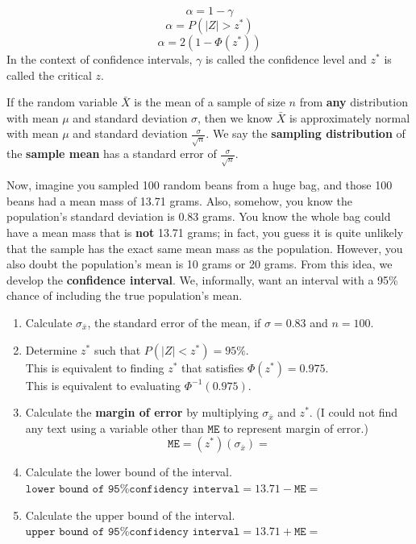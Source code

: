 \documentclass[12pt,letterpaper]{article}
\begin{document}
$$\alpha = 1-\gamma $$
$$\alpha = P(|Z| > z^*) $$
$$\alpha = 2(1-\Phi(z^*)) $$
In the context of confidence intervals, $\gamma$ is called the confidence level and $z^*$ is called the critical $z$.

{ \footnotesize
\begin{multicols}{2}

\end{multicols}
}


\newpage
If the random variable $\bar{X}$ is the mean of a sample of size $n$ from {\bf any} distribution with mean $\mu$ and standard deviation $\sigma$, then we know $\bar{X}$ is approximately normal with mean $\mu$ and standard deviation $\frac{\sigma}{\sqrt{n}}$. We say the {\bf sampling distribution} of the {\bf sample mean} has a standard error of $\frac{\sigma}{\sqrt{n}}$.

Now, imagine you sampled 100 random beans from a huge bag, and those 100 beans had a mean mass of 13.71 grams. Also, somehow, you know the population's standard deviation is 0.83 grams. You know the whole bag could have a mean mass that is {\bf not} 13.71 grams; in fact, you guess it is quite unlikely that the sample has the exact same mean mass as the population. However, you also doubt the population's mean is 10 grams or 20 grams. From this idea, we develop the {\bf confidence interval}. We, informally, want an interval with a 95\% chance of including the true population's mean.

\newcommand{\ME}{\mathtt{ME}}
\newcommand{\SE}{\sigma_{\bar{x}}}


\begin{enumerate}[resume]
\item Calculate $\sigma_{\bar{x}}$, the standard error of the mean, if $\sigma = 0.83$ and $n=100$.
\vfill
\item Determine $z^*$ such that $P(|Z| < z^*) = 95\%$. \\This is equivalent to finding $z^*$ that satisfies $\Phi(z^*)=0.975$.\\
This is equivalent to evaluating $\Phi^{-1}(0.975)$.
\vfill
\item Calculate the {\bf margin of error} by multiplying $\SE$ and $z^*$. (I could not find any text using a variable other than $\ME$ to represent margin of error.)
$$\ME = (z^*)(\SE) =$$
\vfill
\item Calculate the lower bound of the interval.\\
$\texttt{lower bound of 95\% confidency interval} = 13.71-\ME = $
\vfill
\item Calculate the upper bound of the interval.\\
$\texttt{upper bound of 95\% confidency interval} = 13.71+\ME = $
\vfill
\end{enumerate}
\end{document}

